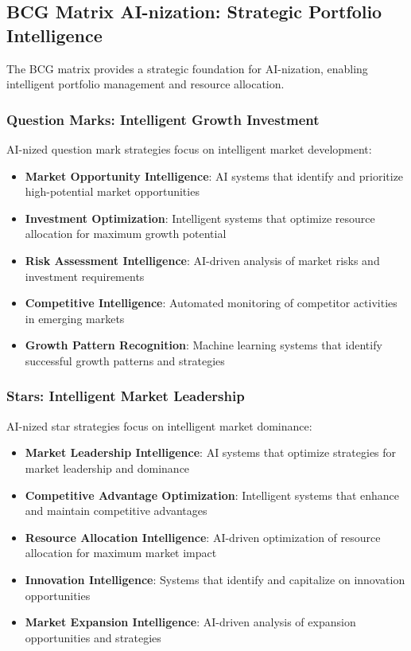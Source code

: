 \subsection{BCG Matrix AI-nization: Strategic Portfolio Intelligence}

The BCG matrix provides a strategic foundation for AI-nization, enabling intelligent portfolio management and resource allocation.

\subsubsection{Question Marks: Intelligent Growth Investment}

AI-nized question mark strategies focus on intelligent market development:

\begin{itemize}
    \item \textbf{Market Opportunity Intelligence}: AI systems that identify and prioritize high-potential market opportunities
    \item \textbf{Investment Optimization}: Intelligent systems that optimize resource allocation for maximum growth potential
    \item \textbf{Risk Assessment Intelligence}: AI-driven analysis of market risks and investment requirements
    \item \textbf{Competitive Intelligence}: Automated monitoring of competitor activities in emerging markets
    \item \textbf{Growth Pattern Recognition}: Machine learning systems that identify successful growth patterns and strategies
\end{itemize}

\subsubsection{Stars: Intelligent Market Leadership}

AI-nized star strategies focus on intelligent market dominance:

\begin{itemize}
    \item \textbf{Market Leadership Intelligence}: AI systems that optimize strategies for market leadership and dominance
    \item \textbf{Competitive Advantage Optimization}: Intelligent systems that enhance and maintain competitive advantages
    \item \textbf{Resource Allocation Intelligence}: AI-driven optimization of resource allocation for maximum market impact
    \item \textbf{Innovation Intelligence}: Systems that identify and capitalize on innovation opportunities
    \item \textbf{Market Expansion Intelligence}: AI-driven analysis of expansion opportunities and strategies
\end{itemize}

